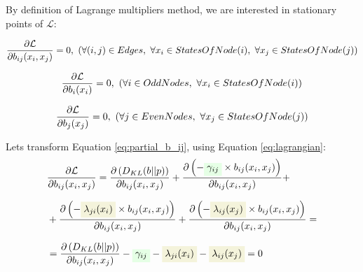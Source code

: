 \documentclass[fleqn,leqno]{article}
\newcommand{\highlight}[1]{\colorbox{green!10}{$\displaystyle#1$}}
\newcommand{\highlightred}[1]{\colorbox{olive!10}{$\displaystyle#1$}}
\begin{document}
\noindent
By definition of Lagrange multipliers method, we are interested in stationary points of $\mathcal{L}$:

\begin{equation} \label{eq:partial_b_ij}
{\partial \mathcal{L} \over \partial b_{ij}(x_i,x_j)} = 0,\ (\forall (i,j) \in Edges,\ \forall x_i \in StatesOfNode(i),\ \forall x_j \in StatesOfNode(j))
\end{equation}

\begin{equation} \label{eq:partial_b_i}
{\partial \mathcal{L} \over \partial b_i(x_i)} = 0,\ (\forall i \in OddNodes,\ \forall x_i \in StatesOfNode(i))
\end{equation}

\begin{equation}
{\partial \mathcal{L} \over \partial b_j(x_j)} = 0,\ (\forall j \in EvenNodes,\ \forall x_j \in StatesOfNode(j))
\end{equation}

Lets transform Equation \eqref{eq:partial_b_ij}, using Equation \eqref{eq:lagrangian}:
\begin{equation}
\setlength{\jot}{10pt}
\begin{split}
   & {\partial \mathcal{L} \over \partial b_{ij}(x_i,x_j)} =  {\partial \left( D_{KL}(b||p) \right) \over \partial b_{ij}(x_i, x_j)} + {\partial \left( - \highlight{ \gamma_{ij} } \times b_{ij}(x_i,x_j) \right) \over \partial b_{ij}(x_i, x_j)} + \\
   & + {\partial \left( - \highlightred{ \lambda_{ji}(x_i) } \times b_{ij}(x_i,x_j) \right) \over \partial b_{ij}(x_i, x_j)} + {\partial \left( - \highlightred{ \lambda_{ij}(x_j) } \times b_{ij}(x_i,x_j) \right) \over \partial b_{ij}(x_i, x_j)} = \\
   & = {\partial \left( D_{KL}(b||p) \right) \over \partial b_{ij}(x_i, x_j)} - \highlight{ \gamma_{ij} } - \highlightred{ \lambda_{ji}(x_i) } - \highlightred{ \lambda_{ij}(x_j) } = 0
\end{split}
\end{equation}
\end{document}
